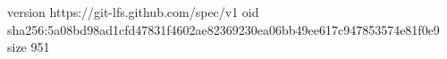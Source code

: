 version https://git-lfs.github.com/spec/v1
oid sha256:5a08bd98ad1cfd47831f4602ae82369230ea06bb49ee617c947853574e81f0e9
size 951
